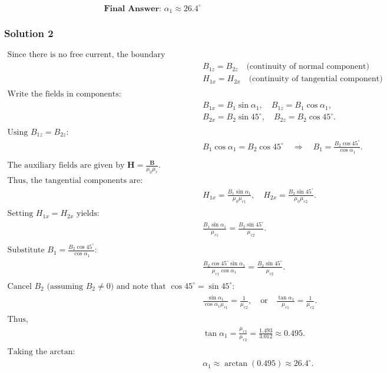 \documentclass{article}
\begin{document}
\[
\textbf{Final Answer: } \alpha_1 \approx 26.4^\circ
\]

\subsubsection{Solution 2}
\[
\begin{aligned}
\text{Since there is no free current, the boundary conditions are:} \\
\quad & B_{1z} = B_{2z} \quad \text{(continuity of normal component)} \\
\quad & H_{1x} = H_{2x} \quad \text{(continuity of tangential component)} \\
\\
\text{Write the fields in components:} \\
& B_{1x} = B_1 \sin \alpha_1,\quad B_{1z} = B_1 \cos \alpha_1, \\
& B_{2x} = B_2 \sin 45^\circ,\quad B_{2z} = B_2 \cos 45^\circ. \\
\\
\text{Using } B_{1z} = B_{2z}: \\
& B_1 \cos \alpha_1 = B_2 \cos 45^\circ \quad \Rightarrow \quad B_1 = \frac{B_2 \cos 45^\circ}{\cos \alpha_1}. \\
\\
\text{The auxiliary fields are given by } \mathbf{H} = \frac{\mathbf{B}}{\mu_0 \mu_r}. \\
\text{Thus, the tangential components are:} \\
& H_{1x} = \frac{B_1 \sin \alpha_1}{\mu_0 \mu_{r1}},\quad H_{2x} = \frac{B_2 \sin 45^\circ}{\mu_0 \mu_{r2}}. \\
\\
\text{Setting } H_{1x} = H_{2x} \text{ yields:} \\
& \frac{B_1 \sin \alpha_1}{\mu_{r1}} = \frac{B_2 \sin 45^\circ}{\mu_{r2}}. \\
\\
\text{Substitute } B_1 = \frac{B_2 \cos 45^\circ}{\cos \alpha_1}: \\
& \frac{B_2 \cos 45^\circ \sin \alpha_1}{\mu_{r1} \cos \alpha_1} = \frac{B_2 \sin 45^\circ}{\mu_{r2}}. \\
\\
\text{Cancel } B_2 \text{ (assuming } B_2 \neq 0 \text{) and note that } \cos 45^\circ = \sin 45^\circ: \\
& \frac{\sin \alpha_1}{\cos \alpha_1 \mu_{r1}} = \frac{1}{\mu_{r2}}, \quad \text{or} \quad \frac{\tan \alpha_1}{\mu_{r1}} = \frac{1}{\mu_{r2}}. \\
\\
\text{Thus,} \\
& \tan \alpha_1 = \frac{\mu_{r1}}{\mu_{r2}} = \frac{1.493}{3.012} \approx 0.495. \\
\\
\text{Taking the arctan:} \\
& \alpha_1 \approx \arctan(0.495) \approx 26.4^\circ.
\end{aligned}
\]
\end{document}
